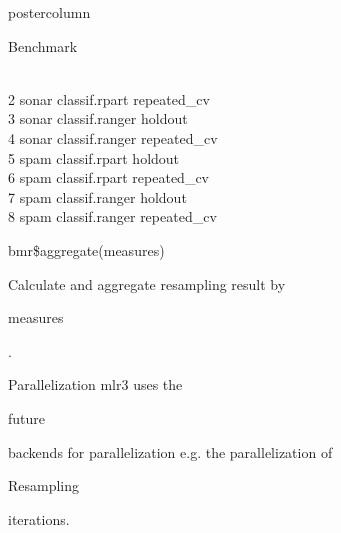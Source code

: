 \documentclass{beamer}
\newcommand{\codeinline}[1]{\begin{codeboxinline}#1\end{codeboxinline}}
\begin{document}
\begin{withoutheader}
\begin{frame}[fragile]{}
\begin{columns}
\begin{column}{.245\textwidth}
\begin{beamercolorbox}[center]{postercolumn}
\begin{minipage}{.98\textwidth}
{\begin{myblock}{Benchmark}
\begin{codeboxmultiline}[width=27cm]
{								\space\space\space{}
								\space\space\space\space\space\space\space 0
								\space\space\space\space{}\\
								2 \space\space\space sonar \space classif.rpart
								\space\space repeated\_cv
								\space\space 100
								\space\space\space\space\space\space{}
								\space\space\space\space\space 0\\
								3 \space\space\space sonar classif.ranger
								\space\space\space\space\space\space holdout
								\space\space\space\space 1
								\space\space\space\space\space\space\space 0
								\space\space\space\space\space 0\\
								4 \space\space\space sonar classif.ranger
								\space\space repeated\_cv
								\space{}
								\space\space\space\space\space\space{}
								\space\space\space\space{}\\
								5 \space\space\space\space spam
								\space classif.rpart
								\space\space\space\space\space\space holdout
								\space\space\space{}
								\space\space\space\space\space\space{}
								\space\space\space\space{}\\
								6 \space\space\space\space spam
								\space  classif.rpart
								\space\space repeated\_cv
								\space{}
								\space\space\space\space\space\space{}
								\space\space\space\space{}\\
								7 \space\space\space\space spam
								classif.ranger
								\space\space\space\space\space\space holdout
								\space\space\space{}
								\space\space\space\space\space\space{}
								\space\space\space\space{}\\
								8 \space\space\space\space spam
								classif.ranger
								\space\space repeated\_cv
								\space{}
								\space\space\space\space\space\space{}
								\space\space\space\space{}
							}
						\end{codeboxmultiline}
						\vspace{1em}
						\begin{codebox}
							bmr\$aggregate(measures)
						\end{codebox}
						Calculate and aggregate resampling result by \codeinline{measures}.
					\end{myblock}
					\begin{myblock}{Parallelization}
						{mlr3} uses the \codeinline{future} backends for parallelization e.g. the parallelization of \codeinline{Resampling} iterations.

\end{myblock}}
\end{minipage}
\end{beamercolorbox}
\end{column}
\end{columns}
\end{frame}
\end{withoutheader}
\end{document}
